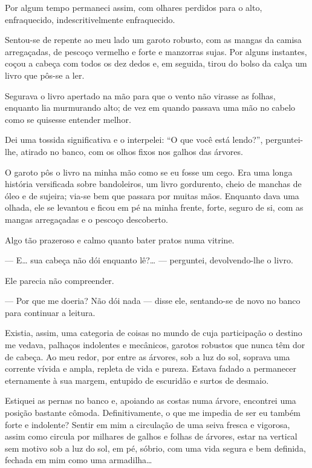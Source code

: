 Por algum tempo permaneci assim, com olhares perdidos para o alto, enfraquecido, indescritivelmente enfraquecido.

Sentou-se de repente ao meu lado um garoto robusto, com as mangas da camisa arregaçadas, de pescoço vermelho e forte e manzorras sujas. Por alguns instantes, coçou a cabeça com todos os dez dedos e, em seguida, tirou do bolso da calça um livro que pôs-se a ler.

Segurava o livro apertado na mão para que o vento não virasse as folhas, enquanto lia murmurando alto; de vez em quando passava uma mão no cabelo como se quisesse entender melhor.

Dei uma tossida significativa e o interpelei: ``O que você está lendo?'', perguntei-lhe, atirado no banco, com os olhos fixos nos galhos das árvores.

O garoto pôs o livro na minha mão como se eu fosse um cego. Era uma longa história versificada sobre bandoleiros, um livro gordurento, cheio de manchas de óleo e de sujeira; via-se bem que passara por muitas mãos. Enquanto dava uma olhada, ele se levantou e ficou em pé na minha frente, forte, seguro de si, com as mangas arregaçadas e o pescoço descoberto.

Algo tão prazeroso e calmo quanto bater pratos numa vitrine.

--- E\ldots{} sua cabeça não dói enquanto lê?\ldots{} --- perguntei, devolvendo-lhe o livro.

Ele parecia não compreender.

--- Por que me doeria? Não dói nada --- disse ele, sentando-se de novo no banco para continuar a leitura.

Existia, assim, uma categoria de coisas no mundo de cuja participação o destino me vedava, palhaços indolentes e mecânicos, garotos robustos que nunca têm dor de cabeça. Ao meu redor, por entre as árvores, sob a luz do sol, soprava uma corrente vívida e ampla, repleta de vida e pureza. Estava fadado a permanecer eternamente à sua margem, entupido de escuridão e surtos de desmaio.

Estiquei as pernas no banco e, apoiando as costas numa árvore, encontrei uma posição bastante cômoda. Definitivamente, o que me impedia de ser eu também forte e indolente? Sentir em mim a circulação de uma seiva fresca e vigorosa, assim como circula por milhares de galhos e folhas de árvores, estar na vertical sem motivo sob a luz do sol, em pé, sóbrio, com uma vida segura e bem definida, fechada em mim como uma armadilha\ldots{}

